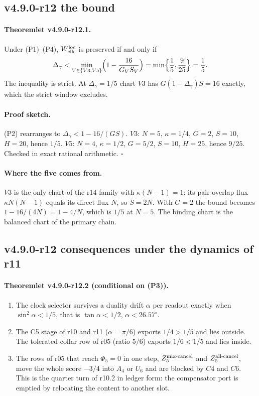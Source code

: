 \subsection*{v4.9.0-r12 the bound}
\label{subsec:v490-r12-bound}

\paragraph{Theoremlet v4.9.0-r12.1.}
Under (P1)--(P4), \(W_{\rm clk}^{\rm loc}\) is preserved if and only if
\[
\Delta_\gamma<\min_{V\in\{V3,V5\}}\Bigl(1-\frac{16}{G_VS_V}\Bigr)=\min\Bigl\{\frac15,\frac9{25}\Bigr\}=\frac15 .
\]
The inequality is strict.  At \(\Delta_\gamma=1/5\) chart \(V3\) has \(G(1-\Delta_\gamma)S=16\) exactly, which the strict window
excludes.

\paragraph{Proof sketch.}
(P2) rearranges to \(\Delta_\gamma<1-16/(GS)\).  \(V3\): \(N=5\), \(\kappa=1/4\), \(G=2\), \(S=10\), \(H=20\), hence \(1/5\).
\(V5\): \(N=4\), \(\kappa=1/2\), \(G=5/2\), \(S=10\), \(H=25\), hence \(9/25\).  Checked in exact rational arithmetic.  \(\square\)

\paragraph{Where the five comes from.}
\(V3\) is the only chart of the r14 family with \(\kappa(N-1)=1\): its pair-overlap flux \(\kappa N(N-1)\) equals its direct
flux \(N\), so \(S=2N\).  With \(G=2\) the bound becomes \(1-16/(4N)=1-4/N\), which is \(1/5\) at \(N=5\).  The binding chart is the
balanced chart of the primary chain.

\subsection*{v4.9.0-r12 consequences under the dynamics of r11}
\label{subsec:v490-r12-consequences}

\paragraph{Theoremlet v4.9.0-r12.2 (conditional on (P3)).}
\begin{enumerate}[leftmargin=2em]
\item[(a)] The clock selector survives a duality drift \(\alpha\) per readout exactly when \(\sin^2\alpha<1/5\), that is
\(\tan\alpha<1/2\), \(\alpha<26.57^\circ\).
\item[(b)] The C5 stage of r10 and r11 (\(\alpha=\pi/6\)) exports \(1/4>1/5\) and lies outside.  The tolerated collar row of
r05 (ratio \(5/6\)) exports \(1/6<1/5\) and lies inside.
\item[(c)] The rows of r05 that reach \(\Phi_5=0\) in one step, \(Z_5^{\rm mix\text{-}cancel}\) and
\(Z_5^{\rm all\text{-}cancel}\), move the whole score \(-3/4\) into \(A_4\) or \(U_6\) and are blocked by \(C4\) and \(C6\).  This is
the quarter turn of r10.2 in ledger form: the compensator port is emptied by relocating the content to another slot.
\end{enumerate}

